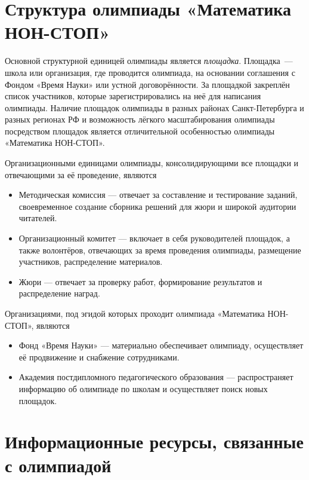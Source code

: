 \documentclass[a4paper,12pt]{article}
\newcommand{\mns}{«Математика НОН-СТОП»\xspace}
\begin{document}
\section{Структура олимпиады \mns}

Основной структурной единицей олимпиады является {\itshape площадка}. Площадка~— школа или организация, где проводится олимпиада, на основании соглашения с Фондом «Время Науки» или устной договорённости. За площадкой закреплён список участников, которые зарегистрировались на неё для написания олимпиады. Наличие площадок олимпиады в разных районах Санкт-Петербурга и разных регионах РФ и возможность лёгкого масштабирования олимпиады посредством площадок является отличительной особенностью олимпиады \mns.

Организационными единицами олимпиады, консолидирующими все площадки и отвечающими за её проведение, являются \vspace{-4mm}

\begin{itemize}
\item Методическая комиссия — отвечает за составление и тестирование заданий, своевременное создание сборника решений для жюри и широкой аудитории читателей.

\item Организационный комитет — включает в себя руководителей площадок, а также волонтёров, отвечающих за время проведения олимпиады, размещение участников, распределение материалов.

\item Жюри — отвечает за проверку работ, формирование результатов и распределение наград.
\end{itemize}

Организациями, под эгидой которых проходит олимпиада \mns, являются \vspace{-4mm}

\begin{itemize}
\item Фонд «Время Науки» — материально обеспечивает олимпиаду, осуществляет её продвижение и снабжение сотрудниками.

\item Академия постдипломного педагогического образования — распространяет информацию об олимпиаде по школам и осуществляет поиск новых площадок.
\end{itemize}

\section{Информационные ресурсы, связанные с олимпиадой}
\end{document}
